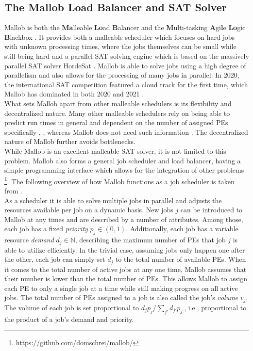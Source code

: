 \subsection{The Mallob Load Balancer and SAT Solver}
\label{prelim: mallob}
Mallob is both the \textbf{Ma}lleable \textbf{Lo}ad \textbf{B}alancer and the \textbf{M}ulti-tasking \textbf{A}gi\textbf{l}e \textbf{Lo}gic \textbf{B}lackbox \cite{schreiber2021scalable}.
It provides both a malleable scheduler which focuses on hard jobs with unknown processing times, where the jobs themselves can be small while still being hard \cite{sanders2022decentralized} and a parallel SAT solving engine which is based on the massively parallel SAT solver HordeSat \cite{balyo2015hordesat}.
Mallob is able to solve jobs using a high degree of parallelism and also allows for the processing of many jobs in parallel. In 2020, the international SAT competition featured a cloud track for the first time, which Mallob has dominated in both 2020 and 2021 \cite{froleyks2021sat, behnke2021satresults}. \\
What sets Mallob apart from other malleable schedulers is its flexibility and decentralized nature. Many other malleable schedulers rely on being able to predict run times in general and dependent on the number of assigned PEs specifically \cite{blazewicz2006preemptable}, \cite{sanders2011efficient}, whereas Mallob does not need such information \cite{sanders2022decentralized}. The decentralized nature of Mallob further avoids bottlenecks.
\\
While Mallob is an excellent malleable SAT solver, it is not limited to this problem. Mallob also forms a general job scheduler and load balancer, having a simple programming interface which allows for the integration of other problems \footnote{https://github.com/domschrei/mallob/}. The following overview of how Mallob functions as a job scheduler is taken from \cite{schreiber2021scalable}. \\
As a scheduler it is able to solve multiple jobs in parallel and adjusts the resources available per job on a dynamic basis. New jobs $j$ can be introduced to Mallob at any times and are described by a number of attributes. Among those, each job has a fixed \textit{priority} $p_j \in (0, 1)$. Additionally, each job has a variable resource \textit{demand} $d_j \in \mathbb{N}$, describing the maximum number of PEs that job $j$ is able to utilize efficiently. In the trivial case, assuming jobs only happen one after the other, each job can simply set $d_j$ to the total number of available PEs. When it comes to the total number of active jobs at any one time, Mallob assumes that their number is lower than the total number of PEs. This allows Mallob to assign each PE to only a single job at a time while still making progress on all active jobs. The total number of PEs assigned to a job is also called the job's \textit{volume} $v_j$. The volume of each job is set proportional to $d_j p_j / \sum_{j'} d_{j'} p_{j'}$, i.e., proportional to the product of a job's demand and priority.\\
